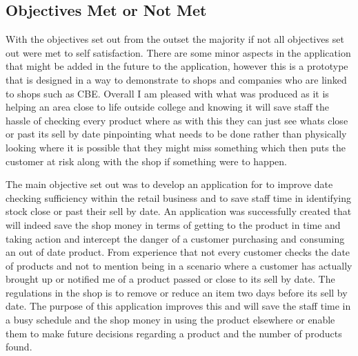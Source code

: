 \subsection{Objectives Met or Not Met}
With the objectives set out from the outset the majority if not all objectives set out were met to self satisfaction. There are some minor aspects in the application that might be added in the future to the application, however this is a prototype that is designed in a way to demonstrate to shops and companies who are linked to shops such as CBE. Overall I am pleased with what was produced as it is helping an area close to life outside college and knowing it will save staff the hassle of checking every product where as with this they can just see whats close or past its sell by date pinpointing what needs to be done rather than physically looking where it is possible that they might miss something which then puts the customer at risk along with the shop if something were to happen.
\newline

The main objective set out was to develop an application for to improve date checking sufficiency within the retail business and to save staff time in identifying stock close or past their sell by date. An application was successfully created that will indeed save the shop money in terms of getting to the product in time and taking action and intercept the danger of a customer purchasing and consuming an out of date product. From experience that not every customer checks the date of products and not to mention being in a scenario where a customer has actually brought up or notified me of a product passed or close to its sell by date. The regulations in the shop is to remove or reduce an item two days before its sell by date. The purpose of this application improves this and will save the staff time in a busy schedule and the shop money in using the product elsewhere or enable them to make future decisions regarding a product and the number of products found.
\newline

